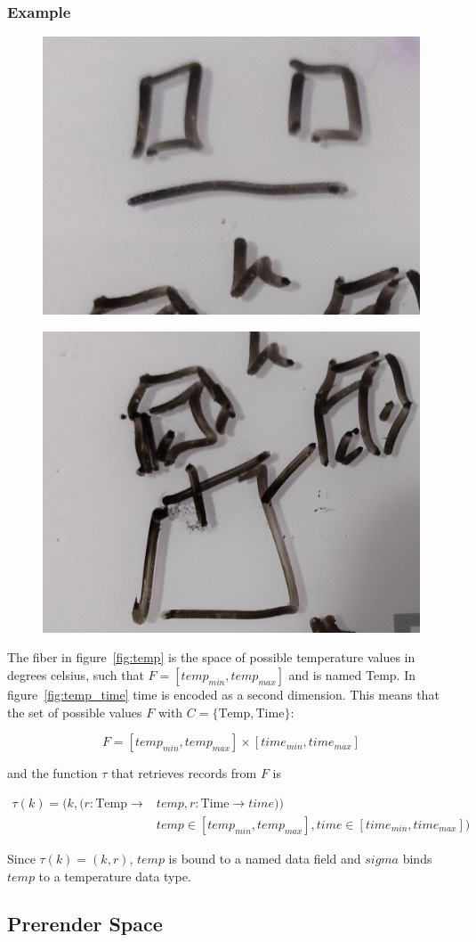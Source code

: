 \documentclass[../main.tex]{subfiles}
\begin{document}
\subsubsection{Example}
\begin{figure}[ht]
    \includegraphics[width=0.2\linewidth]{figures/sections/math/temp_2f.png}
    \label{fig:}
\end{figure}
\begin{figure}[ht]
    \includegraphics[width=0.2\linewidth]{figures/sections/math/temp_3f.png}
\end{figure}


The fiber in figure~\ref{fig:temp} is the space of possible temperature values in degrees celsius, such that $F=[temp_{min}, temp_{max}]$ and is named \textrm{Temp}. In figure~\ref{fig:temp_time} \textrm{time} is encoded as a second dimension. This means that the set of possible values $F$ with $C=\{\textrm{Temp}, \textrm{Time}\}$:

\begin{equation}
F = [temp_{min}, temp_{max}] \times [time_{min}, time_{max}]
\end{equation}

and the function $\tau$ that retrieves records from $F$ is

\begin{align}
\tau(k) =(k, (r: \textrm{Temp}\rightarrow &temp, r: \textrm{Time}\rightarrow time))\\
&temp \in [temp_{min}, temp_{max}], time \in [time_{min}, time_{max}])
\end{align}

Since $\tau(k)=(k, r)$, $temp$ is bound to a named data field and $sigma$ binds $temp$ to a temperature data type. 



\subsection{Prerender Space}
\label{sec:display}
\end{document}
